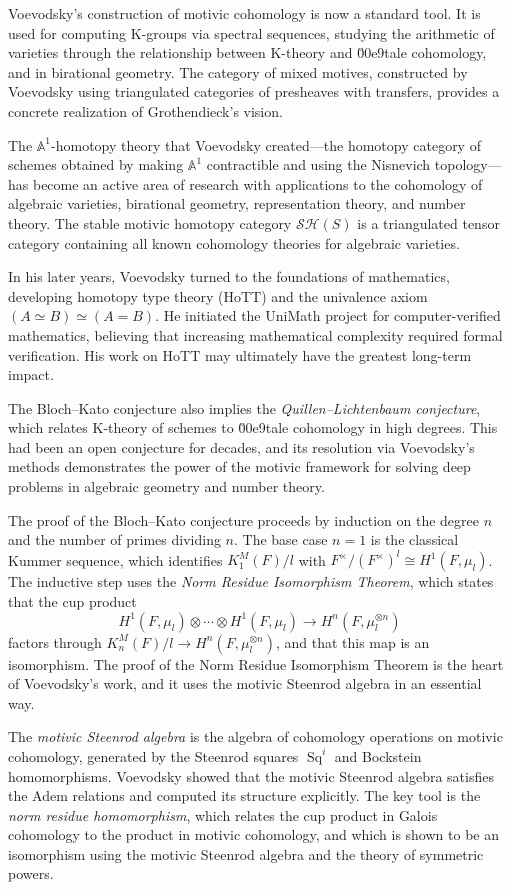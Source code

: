 Voevodsky's construction of motivic cohomology is now a standard tool. It is used for computing K-groups via spectral sequences, studying the arithmetic of varieties through the relationship between K-theory and \u00e9tale cohomology, and in birational geometry. The category of mixed motives, constructed by Voevodsky using triangulated categories of presheaves with transfers, provides a concrete realization of Grothendieck's vision.

The $\mathbb{A}^1$-homotopy theory that Voevodsky created---the homotopy category of schemes obtained by making $\mathbb{A}^1$ contractible and using the Nisnevich topology---has become an active area of research with applications to the cohomology of algebraic varieties, birational geometry, representation theory, and number theory. The stable motivic homotopy category $\mathcal{SH}(S)$ is a triangulated tensor category containing all known cohomology theories for algebraic varieties.

In his later years, Voevodsky turned to the foundations of mathematics, developing homotopy type theory (HoTT) and the univalence axiom $(A \simeq B) \simeq (A = B)$. He initiated the UniMath project for computer-verified mathematics, believing that increasing mathematical complexity required formal verification. His work on HoTT may ultimately have the greatest long-term impact.

The Bloch--Kato conjecture also implies the \emph{Quillen--Lichtenbaum conjecture}, which relates K-theory of schemes to \u00e9tale cohomology in high degrees. This had been an open conjecture for decades, and its resolution via Voevodsky's methods demonstrates the power of the motivic framework for solving deep problems in algebraic geometry and number theory.

The proof of the Bloch--Kato conjecture proceeds by induction on the degree $n$ and the number of primes dividing $n$. The base case $n=1$ is the classical Kummer sequence, which identifies $K^M_1(F)/l$ with $F^\times / (F^\times)^l \cong H^1(F, \mu_l)$. The inductive step uses the \emph{Norm Residue Isomorphism Theorem}, which states that the cup product
\[
H^1(F, \mu_l) \otimes \cdots \otimes H^1(F, \mu_l) \to H^n(F, \mu_l^{\otimes n})
\]
factors through $K^M_n(F)/l \to H^n(F, \mu_l^{\otimes n})$, and that this map is an isomorphism. The proof of the Norm Residue Isomorphism Theorem is the heart of Voevodsky's work, and it uses the motivic Steenrod algebra in an essential way.

The \emph{motivic Steenrod algebra} is the algebra of cohomology operations on motivic cohomology, generated by the Steenrod squares $\operatorname{Sq}^i$ and Bockstein homomorphisms. Voevodsky showed that the motivic Steenrod algebra satisfies the Adem relations and computed its structure explicitly. The key tool is the \emph{norm residue homomorphism}, which relates the cup product in Galois cohomology to the product in motivic cohomology, and which is shown to be an isomorphism using the motivic Steenrod algebra and the theory of symmetric powers.

